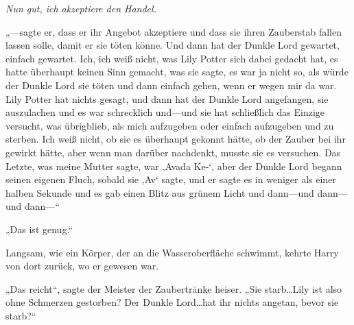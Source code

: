 \emph{Nun gut, ich akzeptiere den Handel.}

„—sagte er, dass er ihr Angebot akzeptiere und dass sie ihren Zauberstab fallen lassen solle, damit er sie töten könne. Und dann hat der Dunkle Lord gewartet, einfach gewartet. Ich, ich weiß nicht, was Lily Potter sich dabei gedacht hat, es hatte überhaupt keinen Sinn gemacht, was sie sagte, es war ja nicht so, als würde der Dunkle Lord sie töten und dann einfach gehen, wenn er wegen mir da war. Lily Potter hat nichts gesagt, und dann hat der Dunkle Lord angefangen, sie auszulachen und es war schrecklich und—und sie hat schließlich das Einzige versucht, was übrigblieb, als mich aufzugeben oder einfach aufzugeben und zu sterben. Ich weiß nicht, ob sie es überhaupt gekonnt hätte, ob der Zauber bei ihr gewirkt hätte, aber wenn man darüber nachdenkt, musste sie es versuchen. Das Letzte, was meine Mutter sagte, war ‚Avada Ke-‘, aber der Dunkle Lord begann seinen eigenen Fluch, sobald sie ‚Av‘ sagte, und er sagte es in weniger als einer halben Sekunde und es gab einen Blitz aus grünem Licht und dann—und dann—und dann—“

„Das ist genug.“

Langsam, wie ein Körper, der an die Wasseroberfläche schwimmt, kehrte Harry von dort zurück, wo er gewesen war.

„Das reicht“, sagte der Meister der Zaubertränke heiser. „Sie starb…Lily ist also ohne Schmerzen gestorben? Der Dunkle Lord…hat ihr nichts angetan, bevor sie starb?“

